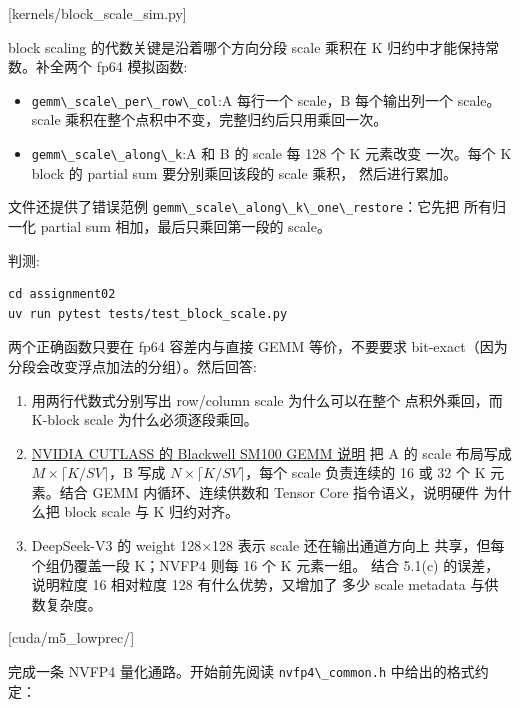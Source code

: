 \documentclass[11pt,a4paper,fontset=none]{ctexart}
\providecommand{\tightlist}{\setlength{\itemsep}{0pt}\setlength{\parskip}{0pt}}
\providecommand{\passthrough}[1]{#1}
\begin{document}
[kernels/block\_scale\_sim.py]

block scaling 的代数关键是沿着哪个方向分段 scale 乘积在 K
归约中才能保持常数。补全两个 fp64 模拟函数:

\begin{itemize}
\tightlist
\item
  \passthrough{\lstinline!gemm\_scale\_per\_row\_col!}:A 每行一个
  scale，B 每个输出列一个 scale。scale
  乘积在整个点积中不变，完整归约后只用乘回一次。
\item
  \passthrough{\lstinline!gemm\_scale\_along\_k!}:A 和 B 的 scale 每 128
  个 K 元素改变 一次。每个 K block 的 partial sum 要分别乘回该段的 scale
  乘积， 然后进行累加。
\end{itemize}

文件还提供了错误范例
\passthrough{\lstinline!gemm\_scale\_along\_k\_one\_restore!}：它先把
所有归一化 partial sum 相加，最后只乘回第一段的 scale。

判测:

\begin{lstlisting}
cd assignment02
uv run pytest tests/test_block_scale.py
\end{lstlisting}

两个正确函数只要在 fp64 容差内与直接 GEMM 等价，不要要求
bit-exact（因为分段会改变浮点加法的分组）。然后回答:

\begin{enumerate}
\def\labelenumi{(\alph{enumi})}
\item
  用两行代数式分别写出 row/column scale 为什么可以在整个 点积外乘回，而
  K-block scale 为什么必须逐段乘回。
\item
  \href{https://docs.nvidia.com/cutlass/latest/media/docs/cpp/blackwell_functionality.html}{NVIDIA
  CUTLASS 的 Blackwell SM100 GEMM 说明} 把 A 的 scale 布局写成
  \(M \times \lceil K/SV \rceil\)，B 写成
  \(N \times \lceil K/SV \rceil\)，每个 scale 负责连续的 16 或 32 个 K
  元素。结合 GEMM 内循环、连续供数和 Tensor Core 指令语义，说明硬件
  为什么把 block scale 与 K 归约对齐。
\item
  DeepSeek-V3 的 weight 128×128 表示 scale 还在输出通道方向上
  共享，但每个组仍覆盖一段 K；NVFP4 则每 16 个 K 元素一组。 结合 5.1(c)
  的误差，说明粒度 16 相对粒度 128 有什么优势，又增加了 多少 scale
  metadata 与供数复杂度。
\end{enumerate}

[cuda/m5\_lowprec/]

完成一条 NVFP4 量化通路。开始前先阅读
\passthrough{\lstinline!nvfp4\_common.h!} 中给出的格式约定：
\end{document}
